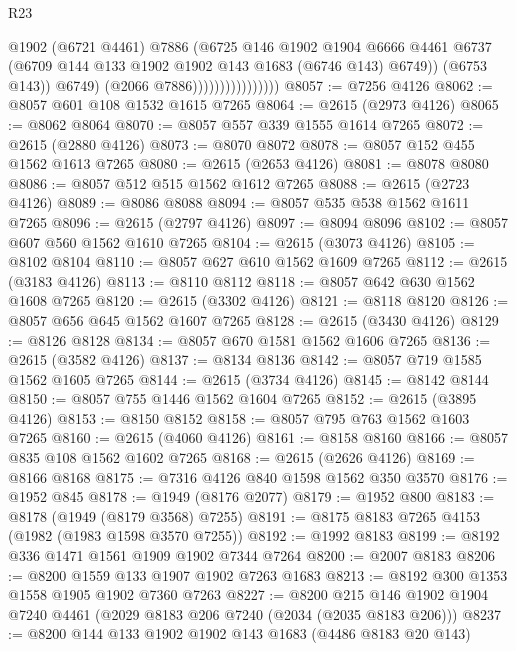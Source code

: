 \begin{lexlean}{R23}
\begin{coremodule}
                                      @1902
                                      (@6721 @4461)
                                      @7886
                                      (@6725
                                        @146
                                        @1902
                                        @1904
                                        @6666
                                        @4461
                                        @6737
                                        (@6709 @144 @133 @1902 @1902 @143 @1683 (@6746 @143) @6749))
                                      (@6753 @143))
                                    @6749)
                                  (@2066 @7886))))))))))))))))
@8057 := @7256 @4126
@8062 := @8057 @601 @108 @1532 @1615 @7265
@8064 := @2615 (@2973 @4126)
@8065 := @8062 @8064
@8070 := @8057 @557 @339 @1555 @1614 @7265
@8072 := @2615 (@2880 @4126)
@8073 := @8070 @8072
@8078 := @8057 @152 @455 @1562 @1613 @7265
@8080 := @2615 (@2653 @4126)
@8081 := @8078 @8080
@8086 := @8057 @512 @515 @1562 @1612 @7265
@8088 := @2615 (@2723 @4126)
@8089 := @8086 @8088
@8094 := @8057 @535 @538 @1562 @1611 @7265
@8096 := @2615 (@2797 @4126)
@8097 := @8094 @8096
@8102 := @8057 @607 @560 @1562 @1610 @7265
@8104 := @2615 (@3073 @4126)
@8105 := @8102 @8104
@8110 := @8057 @627 @610 @1562 @1609 @7265
@8112 := @2615 (@3183 @4126)
@8113 := @8110 @8112
@8118 := @8057 @642 @630 @1562 @1608 @7265
@8120 := @2615 (@3302 @4126)
@8121 := @8118 @8120
@8126 := @8057 @656 @645 @1562 @1607 @7265
@8128 := @2615 (@3430 @4126)
@8129 := @8126 @8128
@8134 := @8057 @670 @1581 @1562 @1606 @7265
@8136 := @2615 (@3582 @4126)
@8137 := @8134 @8136
@8142 := @8057 @719 @1585 @1562 @1605 @7265
@8144 := @2615 (@3734 @4126)
@8145 := @8142 @8144
@8150 := @8057 @755 @1446 @1562 @1604 @7265
@8152 := @2615 (@3895 @4126)
@8153 := @8150 @8152
@8158 := @8057 @795 @763 @1562 @1603 @7265
@8160 := @2615 (@4060 @4126)
@8161 := @8158 @8160
@8166 := @8057 @835 @108 @1562 @1602 @7265
@8168 := @2615 (@2626 @4126)
@8169 := @8166 @8168
@8175 := @7316 @4126 @840 @1598 @1562 @350 @3570
@8176 := @1952 @845
@8178 := @1949 (@8176 @2077)
@8179 := @1952 @800
@8183 := @8178 (@1949 (@8179 @3568) @7255)
@8191 := @8175 @8183 @7265 @4153 (@1982 (@1983 @1598 @3570 @7255))
@8192 := @1992 @8183
@8199 := @8192 @336 @1471 @1561 @1909 @1902 @7344 @7264
@8200 := @2007 @8183
@8206 := @8200 @1559 @133 @1907 @1902 @7263 @1683
@8213 := @8192 @300 @1353 @1558 @1905 @1902 @7360 @7263
@8227 := @8200 @215 @146 @1902 @1904 @7240 @4461 (@2029 @8183 @206 @7240 (@2034 (@2035 @8183 @206)))
@8237 := @8200 @144 @133 @1902 @1902 @143 @1683 (@4486 @8183 @20 @143)

\end{coremodule}
\end{lexlean}
